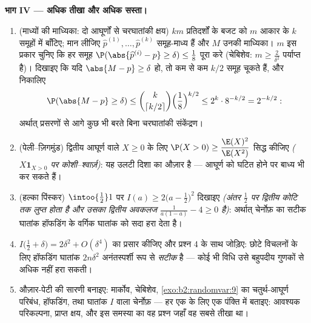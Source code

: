 \begin{problem}
\medskip
\noindent\textbf{भाग IV --- अधिक तीखा और अधिक सस्ता।}
\begin{enumerate}[resume]
  \item (माध्यों की माध्यिका: दो आघूर्णों से चरघातांकी क्षय)
        $km$ प्रतिदर्शों के बजट को $m$ आकार के $k$ 
        समूहों में बाँटिए; मान लीजिए $\widehat p^{(1)}, \dots, \widehat
        p^{(k)}$ समूह-माध्य हैं और $M$
        उनकी माध्यिका। $m$ इस प्रकार चुनिए कि हर समूह $\P(\abs{\widehat p^{(i)} - p} \geq \delta) \leq
        \frac18$ पूरा
        करे (चेबिशेव: $m \geq \frac2{\delta^2}$ पर्याप्त है)। दिखाइए कि यदि $\abs{M - p} \geq \delta$ हो,
        तो कम से कम $k/2$ समूह चूकते हैं, और निकालिए
        \[
        \P(\abs{M - p} \geq \delta)
        \leq \binom{k}{\lceil k/2\rceil}\Bigl(\frac18
        \Bigr)^{k/2}
        \leq 2^k\cdot 8^{-k/2} = 2^{-k/2} :
        \]
        अर्थात् प्रसरणों से आगे कुछ भी बरते बिना चरघातांकी
        संकेंद्रण।
  \item (पेली--ज़िगमुंड) द्वितीय आघूर्ण वाले $X \geq 0$ के लिए $\P(X > 0) \geq \dfrac{\E(X)^2}{\E(X^2)}$
        सिद्ध कीजिए \emph{($X\mathbf 1_{X>0}$ पर कोशी--श्वार्ज़)}: यह उलटी
        दिशा का औज़ार है --- आघूर्ण  को घटित होने पर बाध्य
        भी कर सकते हैं।
  \item (हल्का पिंस्कर) $\intoo{\frac12}1$ पर $I(a) \geq 2\bigl(a -
        \tfrac12\bigr)^2$ दिखाइए \emph{(अंतर $\frac12$
        पर द्वितीय कोटि तक लुप्त होता है और उसका द्वितीय
        अवकलज $\frac1{a(1-a)} - 4 \geq
        0$ है)}: अर्थात् चेर्नोफ़ का सटीक घातांक
        हॉफडिंग के वर्गिक घातांक को सदा हरा देता है।
  \item $I\bigl(\tfrac12 + \delta\bigr) = 2\delta^2 +
        O(\delta^4)$ का प्रसार कीजिए और प्रश्न 4 के साथ जोड़िए: छोटे
        विचलनों के लिए हॉफडिंग घातांक $2n\delta^2$ अनंतस्पर्शी रूप से
        \emph{सटीक} है --- कोई भी विधि उसे बहुपदीय गुणकों से
        अधिक नहीं हरा सकती।
  \item औज़ार-पेटी की सारणी बनाइए: मार्कोव, चेबिशेव, \cref{exo:b2:randomvar:9} का
        चतुर्थ-आघूर्ण परिबंध, हॉफडिंग, तथा घातांक $I$ वाला
        चेर्नोफ़ --- हर एक के लिए एक पंक्ति में बताइए: आवश्यक
        परिकल्पना, प्राप्त क्षय, और इस समस्या का वह प्रश्न जहाँ
        वह सबसे तीखा था।
\end{enumerate}


\end{problem}
